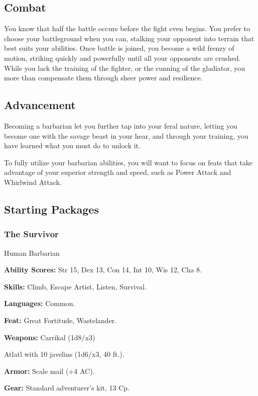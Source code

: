 \subsection{Combat}

You know that half the battle occurs before the fight even begins. You prefer to choose your battleground when you can, stalking your opponent into terrain that best suits your abilities. Once battle is joined, you become a wild frenzy of motion, striking quickly and powerfully until all your opponents are crushed. While you lack the training of the fighter, or the cunning of the gladiator, you more than compensate them through sheer power and resilience.

\subsection{Advancement}

Becoming a barbarian let you further tap into your feral nature, letting you become one with the savage beast in your hear, and through your training, you have learned what you must do to unlock it.

To fully utilize your barbarian abilities, you will want to focus on feats that take advantage of your superior strength and speed, such as Power Attack and Whirlwind Attack.

\subsection{Starting Packages}

\subsubsection{The Survivor}

Human Barbarian

\textbf{Ability Scores:} Str 15, Dex 13, Con 14, Int 10, Wis 12, Cha 8.

\textbf{Skills:} Climb, Escape Artist, Listen, Survival.

\textbf{Languages:} Common.

\textbf{Feat:} Great Fortitude, Wastelander.

\textbf{Weapons:} Carrikal (1d8/x3)

Atlatl with 10 javelins (1d6/x3, 40 ft.).

\textbf{Armor:} Scale mail (+4 AC).

\textbf{Gear:} Standard adventurer's kit, 13 Cp.


